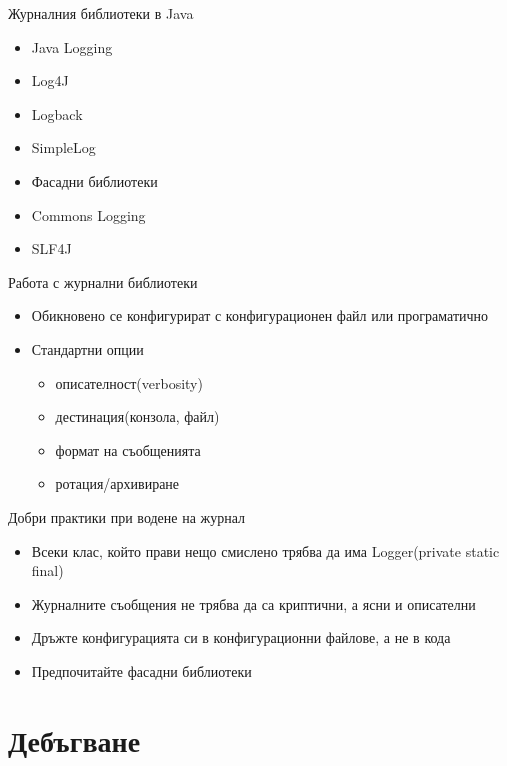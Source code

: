 \documentclass{beamer}
\begin{document}
\begin{frame}{Журналния библиотеки в Java}
  \transdissolve
  \begin{itemize}
  \item Java Logging
  \item Log4J
  \item Logback
  \item SimpleLog
  \item Фасадни библиотеки
    \item Commons Logging
    \item SLF4J
  \end{itemize}
\end{frame}

\begin{frame}{Работа с журнални библиотеки}
  \transdissolve
  \begin{itemize}
  \item Обикновено се конфигурират с конфигурационен файл или
    програматично
  \item Стандартни опции
    \begin{itemize}
      \item описателност(verbosity)
      \item дестинация(конзола, файл)
      \item формат на съобщенията
      \item ротация/архивиране
    \end{itemize}

  \end{itemize}
\end{frame}

\begin{frame}{Добри практики при водене на журнал}
  \transdissolve
  \begin{itemize}
  \item Всеки клас, който прави нещо смислено трябва да има
    Logger(private static final)
  \item Журналните съобщения не трябва да са криптични, а ясни и
    описателни
  \item Дръжте конфигурацията си в конфигурационни файлове, а не в
    кода
  \item Предпочитайте фасадни библиотеки
  \end{itemize}
\end{frame}


\section{Дебъгване}
\end{document}
